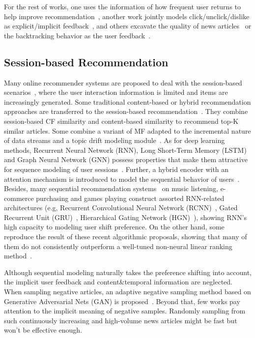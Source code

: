For the rest of works, one uses the information of how frequent user returns to help improve recommendation~\cite{zheng2018drn}, another work jointly models click/unclick/dislike as explicit/implicit feedback~\cite{xie2020deep}, and others excavate the quality of news articles~\cite{lu_quality_2019} or the backtracking behavior as the user feedback~\cite{smadja_understanding_2019}.
\subsection{Session-based Recommendation}
Many online recommender systems are proposed to deal with the session-based scenarios~\cite{epure_recommending_2017,zhou_variational_2019}, where the user interaction information is limited and items are increasingly generated. Some traditional content-based or hybrid recommendation approaches are transferred to the session-based recommendation~\cite{sottocornola2018session}.  They combine session-based CF similarity and content-based similarity to recommend top-K similar articles. Some combine a variant of MF adapted to the incremental nature of data streams and a topic drift modeling module~\cite{al2018adaptive}. As for deep learning methods, Recurrent Neural Network (RNN), Long Short-Term Memory (LSTM) and Graph Neural Network (GNN) possess properties that make them attractive for sequence modeling of user sessions~\cite{guo_streaming_2019,hidasi2015session,wang2019modeling,moreira_news_2018,wu2019session}. Further, a hybrid encoder with an attention mechanism is introduced to model the sequential behavior of users~\cite{li2017neural,liu2018stamp,xu2019time,song_islf_2019,zhang_feature-level_2019}. 
Besides, many sequential recommendation systems~\cite{pereira2019online,xu2019graph} on music listening, e-commerce purchasing and games playing construct assorted RNN-related architectures (e.g, Recurrent Convolutional Neural Network (RCNN)~\cite{xu_recurrent_2019}, Gated Recurrent Unit (GRU)~\cite{hidasi2018recurrent}, Hierarchical Gating Network (HGN)~\cite{xiao2019hierarchical,ma2019hierarchical}), showing RNN's high capacity to modeling user shift preference. On the other hand, some reproduce the result of these recent algorithmic proposals, showing that many of them do not consistently outperform a well-tuned non-neural linear ranking method~\cite{dacrema_are_2019,ludewig_performance_2019}.

Although sequential modeling naturally takes the preference shifting into account, the implicit user feedback and content\&temporal information are neglected. When sampling negative articles, an adaptive negative sampling method based on Generative Adversarial Nets (GAN) is proposed~\cite{wang_neural_2018}. Beyond that, few works pay attention to the implicit meaning of negative samples. Randomly sampling from such continuously increasing and high-volume news articles might be fast but won't be effective enough.

